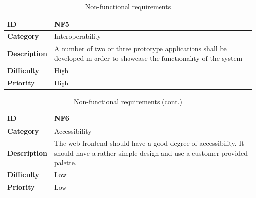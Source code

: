 \begin{table}[H]
\begin{center}
\begin{tabular}{ | l | p{11.5cm} | }
	\textbf{ID} & NF5 \\
  \hline\noalign{\smallskip}\hline
  \textbf{Category}			&	Interoperability \\
  \textbf{Description}	& A number of two or three prototype applications shall be developed in order to showcase
  												the functionality of the system \\
  \textbf{Difficulty}		& High \\
  \textbf{Priority}			& High \\
  
  \hline
\end{tabular}
\end{center}
\caption{Non-functional requirements}
\label{table:nonfunc}
\end{table}

\begin{table}[H]
\begin{center}
\begin{tabular}{ | l | p{11.5cm} | }
	\hline
	
	\textbf{ID} & NF6 \\
  \hline\noalign{\smallskip}\hline
  \textbf{Category}			&	Accessibility \\
  \textbf{Description}	& The web-frontend should have a good degree of accessibility.
  												It should have a rather simple design and use a customer-provided palette. \\
  \textbf{Difficulty}		& Low \\
  \textbf{Priority}			& Low \\
	
	\hline
\end{tabular}
\end{center}
\caption{Non-functional requirements (cont.)}
\end{table}

